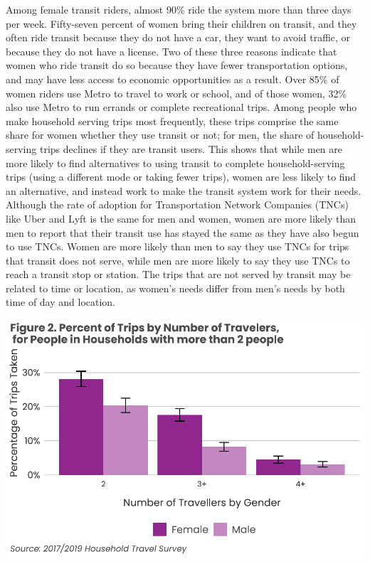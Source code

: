 \documentclass[
  12pt,
]{article}
\begin{document}
\begin{flushleft}
Among female transit riders, almost 90\% ride the system more than three days per week. Fifty-seven percent of women bring their children on transit, and they often ride transit because they do not have a car, they want to avoid traffic, or because they do not have a license. Two of these three reasons indicate that women who ride transit do so because they have fewer transportation options, and may have less access to economic opportunities as a result. Over 85\% of women riders use Metro to travel to work or school, and of those women, 32\% also use Metro to run errands or complete recreational trips. Among people who make household serving trips most frequently, these trips comprise the same share for women whether they use transit or not; for men, the share of household-serving trips declines if they are transit users. This shows that while men are more likely to find alternatives to using transit to complete household-serving trips (using a different mode or taking fewer trips), women are less likely to find an alternative, and instead work to make the transit system work for their needs. Although the rate of adoption for Transportation Network Companies (TNCs) like Uber and Lyft is the same for men and women, women are more likely than men to report that their transit use has stayed the same as they have also begun to use TNCs. Women are more likely than men to say they use TNCs for trips that transit does not serve, while men are more likely to say they use TNCs to reach a transit stop or station. The trips that are not served by transit may be related to time or location, as women’s needs differ from men’s needs by both time of day and location.
\end{flushleft}

\includegraphics{womens_history_story_draft_files/figure-latex/Trips by Number of Travellers-1.pdf}
\newpage \setlength{\headheight}{10pt} \setlength{\textheight}{665pt}
\fancyhead[L]{}
\end{document}
